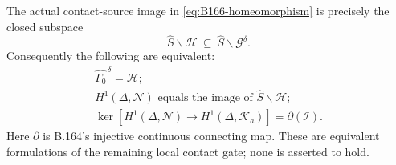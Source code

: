 The actual contact-source image in \eqref{eq:B166-homeomorphism}
is precisely the closed subspace
\begin{equation}\label{eq:B166-source-subspace}
 \widehat S\backslash\mathcal H
       \ \subseteq\ \widehat S\backslash\mathcal G^\delta.
\end{equation}
Consequently the following are equivalent:
\begin{equation}\label{eq:B166-equivalences}
 \begin{gathered}
 \widehat{\Gamma_0}^{\,\delta}=\mathcal H;\\
 H^1(\Delta,\mathcal N)
     \text{ equals the image of }\widehat S\backslash\mathcal H;\\
 \ker\!\left[
 H^1(\Delta,\mathcal N)\longrightarrow H^1(\Delta,\mathcal K_a)
 \right]=\partial(\mathcal I).
 \end{gathered}
\end{equation}
Here \(\partial\) is B.164's injective continuous connecting map.
These are equivalent formulations of the remaining local contact
gate; none is asserted to hold.

